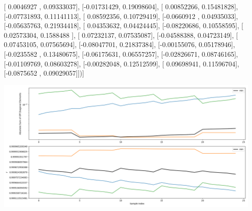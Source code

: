 \documentclass{article}
\begin{document}
       [ 0.0046927 ,  0.09333037],
       [-0.01731429,  0.19098604],
       [ 0.00852266,  0.15481828],
       [-0.07731893,  0.11141113],
       [ 0.08592356,  0.10729419],
       [-0.0660912 ,  0.04935033],
       [-0.05635763,  0.21934418],
       [ 0.04353632,  0.04424445],
       [-0.08220686,  0.10558595],
       [ 0.02573304,  0.1588488 ],
       [ 0.07232137,  0.07535087],
       [-0.04588388,  0.04723149],
       [ 0.07453105,  0.07565694],
       [-0.08047701,  0.21837384],
       [-0.00155076,  0.05178946],
       [-0.0235582 ,  0.13480675],
       [-0.06175631,  0.06557257],
       [-0.02826671,  0.08746165],
       [-0.01109769,  0.08603278],
       [-0.00282048,  0.12512599],
       [ 0.09698941,  0.11596704],
       [-0.0875652 ,  0.09029057]])]
\begin{center}
\includegraphics[scale=.9]{report_pickled_controls205/control_dpn_all.png}

\end{center}
\end{document}
